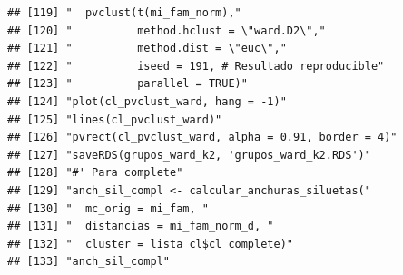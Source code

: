 \documentclass[11pt,]{article}
\begin{document}
\begin{verbatim}
## [119] "  pvclust(t(mi_fam_norm),"                                                                                                                                             
## [120] "          method.hclust = \"ward.D2\","                                                                                                                                
## [121] "          method.dist = \"euc\","                                                                                                                                      
## [122] "          iseed = 191, # Resultado reproducible"                                                                                                                       
## [123] "          parallel = TRUE)"                                                                                                                                            
## [124] "plot(cl_pvclust_ward, hang = -1)"                                                                                                                                      
## [125] "lines(cl_pvclust_ward)"                                                                                                                                                
## [126] "pvrect(cl_pvclust_ward, alpha = 0.91, border = 4)"                                                                                                                     
## [127] "saveRDS(grupos_ward_k2, 'grupos_ward_k2.RDS')"                                                                                                                         
## [128] "#' Para complete"                                                                                                                                                      
## [129] "anch_sil_compl <- calcular_anchuras_siluetas("                                                                                                                         
## [130] "  mc_orig = mi_fam, "                                                                                                                                                  
## [131] "  distancias = mi_fam_norm_d, "                                                                                                                                        
## [132] "  cluster = lista_cl$cl_complete)"                                                                                                                                     
## [133] "anch_sil_compl"                                                                                                                                                        

\end{verbatim}
\end{document}
